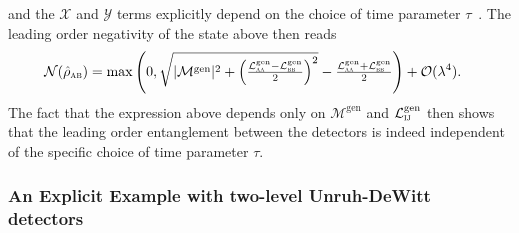 \documentclass[letterpaper,12pt,titlepage,oneside,final]{book}
\renewcommand{\r}{\hat{\rho}}
\newcommand{\tc}[1]{\textsc{#1}}
\begin{document}
and the $\mathcal{X}$ and $\mathcal{Y}$ terms explicitly depend on the choice of time parameter $\tau$~\cite{hectorCov}. The leading order negativity of the state above then reads
\begin{align}\label{eq:neggen}
    \mathcal{N}(\r_\tc{ab}) &= \max\left(0,\sqrt{|\mathcal{M}^\text{gen}|^2 + \left(\tfrac{\mathcal{L}^\text{gen}_\tc{aa} - \mathcal{L}^\text{gen}_\tc{bb}}{2}\right)^2} - \tfrac{\mathcal{L}^\text{gen}_{\tc{aa}} + \mathcal{L}^\text{gen}_\tc{bb}}{2}\right) + \mathcal{O}(\lambda^4).
\end{align}
The fact that the expression above depends only on $\mathcal{M}^\text{gen}$ and $\mathcal{L}_{\tc{ij}}^\text{gen}$ then shows that the leading order entanglement between the detectors is indeed independent of the specific choice of time parameter $\tau$.




\subsubsection*{An Explicit Example with two-level Unruh-DeWitt detectors}
\end{document}
